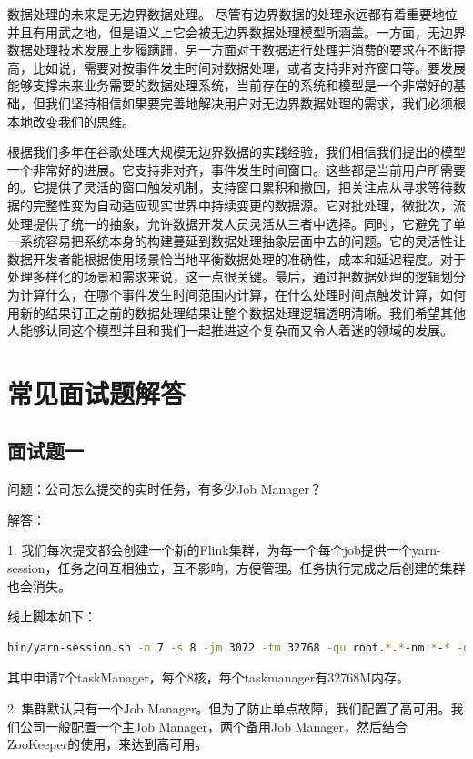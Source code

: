\documentclass[oneside]{ctexbook}
\begin{document}
数据处理的未来是无边界数据处理。 尽管有边界数据的处理永远都有着重要地位并且有用武之地，但是语义上它会被无边界数据处理模型所涵盖。一方面，无边界数据处理技术发展上步履蹒跚，另一方面对于数据进行处理并消费的要求在不断提高，比如说，需要对按事件发生时间对数据处理，或者支持非对齐窗口等。要发展能够支撑未来业务需要的数据处理系统，当前存在的系统和模型是一个非常好的基础，但我们坚持相信如果要完善地解决用户对无边界数据处理的需求，我们必须根本地改变我们的思维。

根据我们多年在谷歌处理大规模无边界数据的实践经验，我们相信我们提出的模型一个非常好的进展。它支持非对齐，事件发生时间窗口。这些都是当前用户所需要的。它提供了灵活的窗口触发机制，支持窗口累积和撤回，把关注点从寻求等待数据的完整性变为自动适应现实世界中持续变更的数据源。它对批处理，微批次，流处理提供了统一的抽象，允许数据开发人员灵活从三者中选择。同时，它避免了单一系统容易把系统本身的构建蔓延到数据处理抽象层面中去的问题。它的灵活性让数据开发者能根据使用场景恰当地平衡数据处理的准确性，成本和延迟程度。对于处理多样化的场景和需求来说，这一点很关键。最后，通过把数据处理的逻辑划分为计算什么，在哪个事件发生时间范围内计算，在什么处理时间点触发计算，如何用新的结果订正之前的数据处理结果让整个数据处理逻辑透明清晰。我们希望其他人能够认同这个模型并且和我们一起推进这个复杂而又令人着迷的领域的发展。

\chapter{常见面试题解答}

\section{面试题一}

问题：公司怎么提交的实时任务，有多少Job Manager？

解答：

1. 我们每次提交都会创建一个新的Flink集群，为每一个每个job提供一个yarn-session，任务之间互相独立，互不影响，方便管理。任务执行完成之后创建的集群也会消失。

线上脚本如下：

\begin{lstlisting}[language=sh]
bin/yarn-session.sh -n 7 -s 8 -jm 3072 -tm 32768 -qu root.*.*-nm *-* -d
\end{lstlisting}

其中申请7个taskManager，每个8核，每个taskmanager有32768M内存。

2. 集群默认只有一个Job Manager。但为了防止单点故障，我们配置了高可用。我们公司一般配置一个主Job Manager，两个备用Job Manager，然后结合ZooKeeper的使用，来达到高可用。
\end{document}
